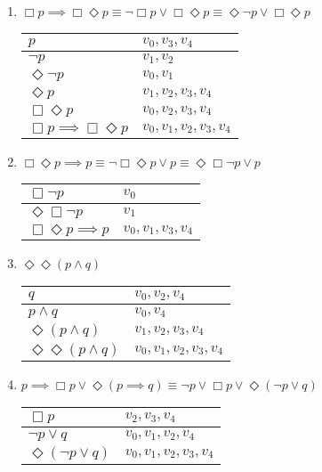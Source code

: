\documentclass[11pt]{article}
\begin{document}
	\begin{enumerate}[label=(\alph*)]
		\item $\Box p \implies \Box\Diamond p \equiv \neg\Box p \lor \Box\Diamond p \equiv \Diamond\neg p \lor \Box\Diamond p$ \\
		\begin{tabular}{ | l | l | }
			\hline
			$p$ & $v_0, v_3, v_4$ \\\hline
			$\neg p$ & $v_1, v_2$ \\\hline
			$\Diamond\neg p$ & $v_0, v_1$ \\\hline
			$\Diamond p$ & $v_1, v_2, v_3, v_4$ \\\hline
			$\Box\Diamond p$ & $v_0, v_2, v_3, v_4$ \\\hline
			$\Box p \implies \Box\Diamond p$ & $v_0, v_1, v_2, v_3, v_4$ \\\hline
		\end{tabular}
		\item $\Box\Diamond p \implies p \equiv \neg\Box\Diamond p \lor p \equiv \Diamond\Box\neg p \lor p$ \\
		\begin{tabular}{ | l | l | }
			\hline
			$\Box\neg p$ & $v_0$ \\\hline
			$\Diamond\Box\neg p$ & $v_1$ \\\hline
			$\Box\Diamond p \implies p$ & $v_0, v_1, v_3, v_4$ \\\hline
		\end{tabular}
		\item $\Diamond\Diamond (p \land q)$ \\
		\begin{tabular}{ | l | l | }
			\hline
			$q$ & $v_0, v_2, v_4$ \\\hline
			$p \land q$ & $v_0, v_4$ \\\hline
			$\Diamond (p \land q)$ & $v_1, v_2, v_3, v_4$ \\\hline
			$\Diamond\Diamond (p \land q)$ & $v_0, v_1, v_2, v_3, v_4$ \\\hline
		\end{tabular}
		\item $p \implies \Box p \lor \Diamond (p \implies q) \equiv \neg p \lor \Box p \lor \Diamond (\neg p \lor q)$ \\
		\begin{tabular}{ | l | l | }
			\hline
			$\Box p$ & $v_2, v_3, v_4$ \\\hline
			$\neg p \lor q$ & $v_0, v_1, v_2, v_4$ \\\hline
			$\Diamond (\neg p \lor q)$ & $v_0, v_1, v_2, v_3, v_4$ \\\hline

\end{tabular}
\end{enumerate}
\end{document}
